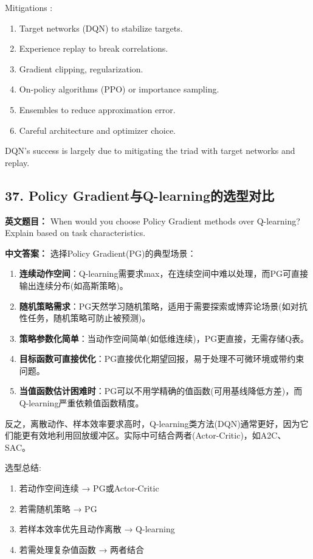 \documentclass[10pt,a4paper]{ctexart}
\begin{document}
 Mitigations :
\begin{enumerate}
    \item Target networks (DQN) to stabilize targets.
    \item Experience replay to break correlations.
    \item Gradient clipping, regularization.
    \item On-policy algorithms (PPO) or importance sampling.
    \item Ensembles to reduce approximation error.
    \item Careful architecture and optimizer choice.
\end{enumerate}

DQN's success is largely due to mitigating the triad with target networks and replay.

\subsection*{37. Policy Gradient与Q-learning的选型对比}
\textbf{英文题目：} When would you choose Policy Gradient methods over Q-learning? Explain based on task characteristics.

\textbf{中文答案：}  
选择Policy Gradient(PG)的典型场景：
\begin{enumerate}
    \item \textbf{连续动作空间}：Q-learning需要求max，在连续空间中难以处理，而PG可直接输出连续分布(如高斯策略)。
    \item \textbf{随机策略需求}：PG天然学习随机策略，适用于需要探索或博弈论场景(如对抗性任务，随机策略可防止被预测)。
    \item \textbf{策略参数化简单}：当动作空间简单(如低维连续)，PG更直接，无需存储Q表。
    \item \textbf{目标函数可直接优化}：PG直接优化期望回报，易于处理不可微环境或带约束问题。
    \item \textbf{当值函数估计困难时}：PG可以不用学精确的值函数(可用基线降低方差)，而Q-learning严重依赖值函数精度。
\end{enumerate}

反之，离散动作、样本效率要求高时，Q-learning类方法(DQN)通常更好，因为它们能更有效地利用回放缓冲区。实际中可结合两者(Actor-Critic)，如A2C、SAC。

 选型总结:
\begin{enumerate}
    \item 若动作空间连续 → PG或Actor-Critic
    \item 若需随机策略 → PG
    \item 若样本效率优先且动作离散 → Q-learning
    \item 若需处理复杂值函数 → 两者结合
\end{enumerate}
\end{document}
